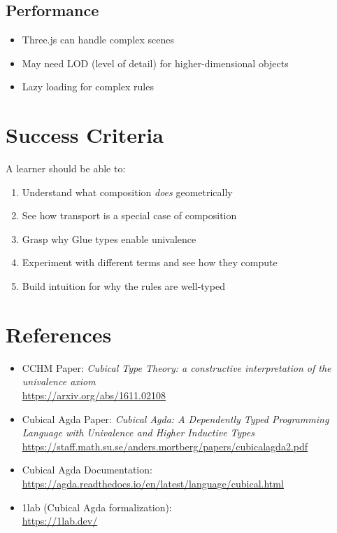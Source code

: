 \documentclass[11pt,a4paper]{article}
\begin{document}
\subsection{Performance}
\begin{itemize}
\item Three.js can handle complex scenes
\item May need LOD (level of detail) for higher-dimensional objects
\item Lazy loading for complex rules
\end{itemize}

\section{Success Criteria}

A learner should be able to:
\begin{enumerate}
\item Understand what composition \emph{does} geometrically
\item See how transport is a special case of composition
\item Grasp why Glue types enable univalence
\item Experiment with different terms and see how they compute
\item Build intuition for why the rules are well-typed
\end{enumerate}

\section{References}

\begin{itemize}
\item CCHM Paper: \textit{Cubical Type Theory: a constructive interpretation of the univalence axiom} \\
  \url{https://arxiv.org/abs/1611.02108}
\item Cubical Agda Paper: \textit{Cubical Agda: A Dependently Typed Programming Language with Univalence and Higher Inductive Types} \\
  \url{https://staff.math.su.se/anders.mortberg/papers/cubicalagda2.pdf}
\item Cubical Agda Documentation: \\
  \url{https://agda.readthedocs.io/en/latest/language/cubical.html}
\item 1lab (Cubical Agda formalization): \\
  \url{https://1lab.dev/}
\end{itemize}
\end{document}
